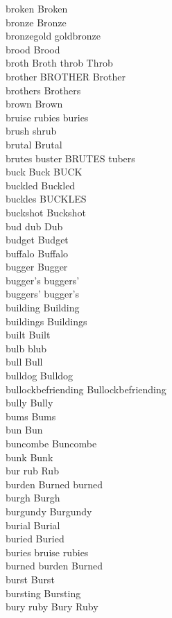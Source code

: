 broken Broken\\
bronze Bronze\\
bronzegold goldbronze\\
brood Brood\\
broth Broth throb Throb\\
brother BROTHER Brother\\
brothers Brothers\\
brown Brown\\
bruise rubies buries\\
brush shrub\\
brutal Brutal\\
brutes buster BRUTES tubers\\
buck Buck BUCK\\
buckled Buckled\\
buckles BUCKLES\\
buckshot Buckshot\\
bud dub Dub\\
budget Budget\\
buffalo Buffalo\\
bugger Bugger\\
bugger's buggers'\\
buggers' bugger's\\
building Building\\
buildings Buildings\\
built Built\\
bulb blub\\
bull Bull\\
bulldog Bulldog\\
bullockbefriending Bullockbefriending\\
bully Bully\\
bums Bums\\
bun Bun\\
buncombe Buncombe\\
bunk Bunk\\
bur rub Rub\\
burden Burned burned\\
burgh Burgh\\
burgundy Burgundy\\
burial Burial\\
buried Buried\\
buries bruise rubies\\
burned burden Burned\\
burst Burst\\
bursting Bursting\\
bury ruby Bury Ruby\\
